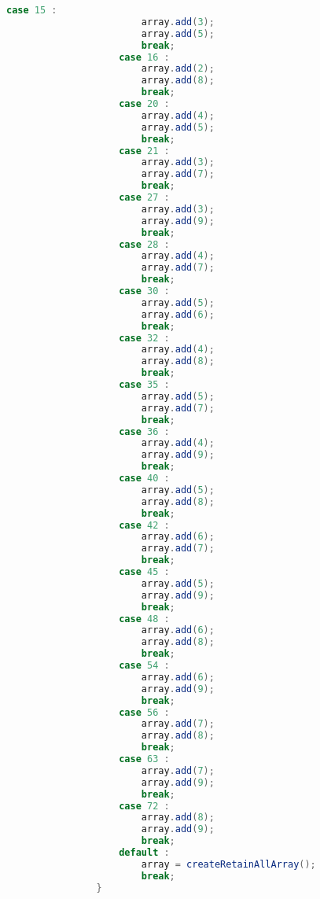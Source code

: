 \begin{lstlisting}[language=Java,basicstyle=\tiny,caption=SolverRuleBased.java]
                    case 15 :
                        array.add(3);
                        array.add(5);
                        break;
                    case 16 :
                        array.add(2);
                        array.add(8);
                        break;
                    case 20 :
                        array.add(4);
                        array.add(5);
                        break;
                    case 21 :
                        array.add(3);
                        array.add(7);
                        break;
                    case 27 :
                        array.add(3);
                        array.add(9);
                        break;
                    case 28 :
                        array.add(4);
                        array.add(7);
                        break;
                    case 30 :
                        array.add(5);
                        array.add(6);
                        break;
                    case 32 :
                        array.add(4);
                        array.add(8);
                        break;
                    case 35 :
                        array.add(5);
                        array.add(7);
                        break;
                    case 36 :
                        array.add(4);
                        array.add(9);
                        break;
                    case 40 :
                        array.add(5);
                        array.add(8);
                        break;
                    case 42 :
                        array.add(6);
                        array.add(7);
                        break;
                    case 45 :
                        array.add(5);
                        array.add(9);
                        break;
                    case 48 :
                        array.add(6);
                        array.add(8);
                        break;
                    case 54 :
                        array.add(6);
                        array.add(9);
                        break;
                    case 56 :
                        array.add(7);
                        array.add(8);
                        break;
                    case 63 :
                        array.add(7);
                        array.add(9);
                        break;
                    case 72 :
                        array.add(8);
                        array.add(9);
                        break;
                    default :
                        array = createRetainAllArray();
                        break;
                }

\end{lstlisting}
